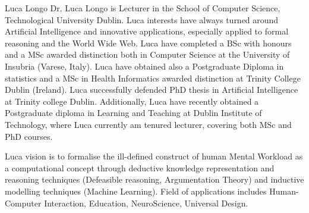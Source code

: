 \begin{IEEEbiography}{Luca Longo}  
Dr. Luca Longo is Lecturer in the School of Computer Science, Technological University Dublin.
Luca interests have always turned around Artificial Intelligence and innovative applications, especially applied to formal reasoning and the World Wide Web. Luca have completed a BSc with honours and a MSc awarded distinction both in Computer Science at the University of Insubria (Varese, Italy). Luca have obtained also a Postgraduate Diploma in statistics and a MSc in Health Informatics awarded distinction at Trinity College Dublin (Ireland). Luca successfully defended  PhD thesis in Artificial Intelligence at Trinity college Dublin. Additionally, Luca have recently obtained a Postgraduate diploma in Learning and Teaching at Dublin Institute of Technology, where Luca currently am tenured lecturer, covering both MSc and PhD courses.

Luca vision  is to formalise the ill-defined construct of human Mental Workload as a computational concept through deductive knowledge representation and reasoning techniques (Defeasible reasoning, Argumentation Theory) and inductive modelling techniques (Machine Learning). Field of applications includes Human-Computer Interaction, Education, NeuroScience, Universal Design.
\end{IEEEbiography}


